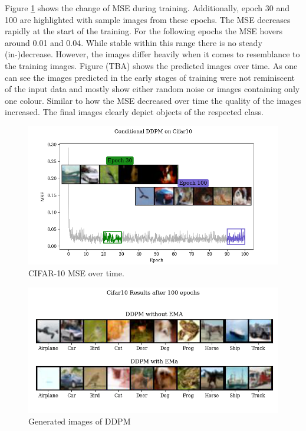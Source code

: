 \documentclass[12pt]{article}
\theoremstyle{plain}
\theoremstyle{definition}
\theoremstyle{remark}
\begin{document}
Figure \ref{fig:cifar10msewithpredictions} shows the change of \ac{MSE} during training. Additionally, epoch 30 and 100 are highlighted with sample images from these epochs. The \ac{MSE} decreases rapidly at the start of the training. For the following epochs the \ac{MSE} hovers around 0.01 and 0.04. While stable within this range there is no steady (in-)decrease. However, the images differ heavily when it comes to resemblance to the training images. 
Figure (TBA) shows the predicted images over time. As one can see the images predicted in the early stages of training were not reminiscent of the input data and mostly show either random noise or images containing only one colour. Similar to how the \ac{MSE} decreased over time the quality of the images increased. The final images clearly depict objects of the respected class. 

\begin{figure}[H]
	\centering
	\includegraphics[width=\linewidth]{src/Images/cifar10_mse_with_predictions}
	\caption[\ac{CIFAR-10} \ac{MSE} over time.]{\ac{CIFAR-10} \ac{MSE} over time.}
	\label{fig:cifar10msewithpredictions}
\end{figure}


\begin{figure}[H]
	\centering
	\includegraphics[width=1\linewidth]{src/Images/cifar10_results}
	\caption[Generated \ac{CIFAR-10} images of \ac{DDPM}]{Generated images of \ac{DDPM}}
\label{fig:cifar10results}
\end{figure}
\end{document}
